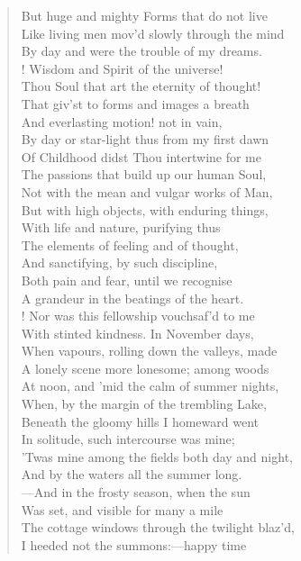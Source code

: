 \begin{verse}
But huge and mighty Forms that do not live  \\
Like living men mov'd slowly through the mind  \\
By day and were the trouble of my dreams.	  \\!
Wisdom and Spirit of the universe!  \\
Thou Soul that art the eternity of thought!  \\
That giv'st to forms and images a breath  \\
And everlasting motion! not in vain,  \\
By day or star-light thus from my first dawn	  \\
Of Childhood didst Thou intertwine for me  \\
The passions that build up our human Soul,  \\
Not with the mean and vulgar works of Man,  \\
But with high objects, with enduring things,  \\
With life and nature, purifying thus	  \\
The elements of feeling and of thought,  \\
And sanctifying, by such discipline,  \\
Both pain and fear, until we recognise  \\
A grandeur in the beatings of the heart.  \\!
Nor was this fellowship vouchsaf'd to me	  \\
With stinted kindness. In November days,  \\
When vapours, rolling down the valleys, made  \\
A lonely scene more lonesome; among woods  \\
At noon, and 'mid the calm of summer nights,  \\
When, by the margin of the trembling Lake,	  \\
Beneath the gloomy hills I homeward went  \\
In solitude, such intercourse was mine;  \\
'Twas mine among the fields both day and night,  \\
And by the waters all the summer long.  \\
---And in the frosty season, when the sun	  \\
Was set, and visible for many a mile  \\
The cottage windows through the twilight blaz'd,  \\
I heeded not the summons:---happy time  \\

\end{verse}
